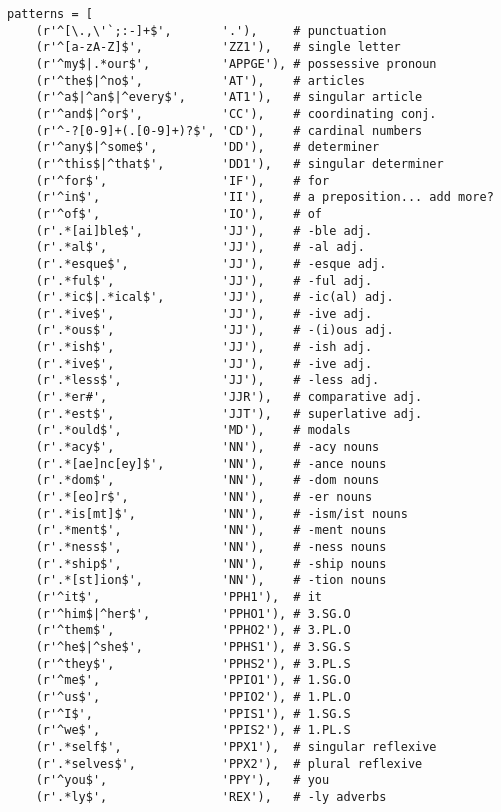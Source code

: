 \documentclass[man,12pt]{apa6}
\begin{document}
\begin{verbatim}
patterns = [
    (r'^[\.,\'`;:-]+$',       '.'),     # punctuation
    (r'^[a-zA-Z]$',           'ZZ1'),   # single letter
    (r'^my$|.*our$',          'APPGE'), # possessive pronoun
    (r'^the$|^no$',           'AT'),    # articles
    (r'^a$|^an$|^every$',     'AT1'),   # singular article
    (r'^and$|^or$',           'CC'),    # coordinating conj.
    (r'^-?[0-9]+(.[0-9]+)?$', 'CD'),    # cardinal numbers
    (r'^any$|^some$',         'DD'),    # determiner
    (r'^this$|^that$',        'DD1'),   # singular determiner
    (r'^for$',                'IF'),    # for
    (r'^in$',                 'II'),    # a preposition... add more?
    (r'^of$',                 'IO'),    # of
    (r'.*[ai]ble$',           'JJ'),    # -ble adj.
    (r'.*al$',                'JJ'),    # -al adj.
    (r'.*esque$',             'JJ'),    # -esque adj.
    (r'.*ful$',               'JJ'),    # -ful adj.
    (r'.*ic$|.*ical$',        'JJ'),    # -ic(al) adj.
    (r'.*ive$',               'JJ'),    # -ive adj.
    (r'.*ous$',               'JJ'),    # -(i)ous adj.
    (r'.*ish$',               'JJ'),    # -ish adj.
    (r'.*ive$',               'JJ'),    # -ive adj.
    (r'.*less$',              'JJ'),    # -less adj.
    (r'.*er#',                'JJR'),   # comparative adj.
    (r'.*est$',               'JJT'),   # superlative adj.
    (r'.*ould$',              'MD'),    # modals
    (r'.*acy$',               'NN'),    # -acy nouns
    (r'.*[ae]nc[ey]$',        'NN'),    # -ance nouns
    (r'.*dom$',               'NN'),    # -dom nouns
    (r'.*[eo]r$',             'NN'),    # -er nouns
    (r'.*is[mt]$',            'NN'),    # -ism/ist nouns
    (r'.*ment$',              'NN'),    # -ment nouns
    (r'.*ness$',              'NN'),    # -ness nouns
    (r'.*ship$',              'NN'),    # -ship nouns
    (r'.*[st]ion$',           'NN'),    # -tion nouns
    (r'^it$',                 'PPH1'),  # it
    (r'^him$|^her$',          'PPHO1'), # 3.SG.O
    (r'^them$',               'PPHO2'), # 3.PL.O
    (r'^he$|^she$',           'PPHS1'), # 3.SG.S
    (r'^they$',               'PPHS2'), # 3.PL.S
    (r'^me$',                 'PPIO1'), # 1.SG.O
    (r'^us$',                 'PPIO2'), # 1.PL.O
    (r'^I$',                  'PPIS1'), # 1.SG.S
    (r'^we$',                 'PPIS2'), # 1.PL.S
    (r'.*self$',              'PPX1'),  # singular reflexive
    (r'.*selves$',            'PPX2'),  # plural reflexive
    (r'^you$',                'PPY'),   # you
    (r'.*ly$',                'REX'),   # -ly adverbs

\end{verbatim}
\end{document}
